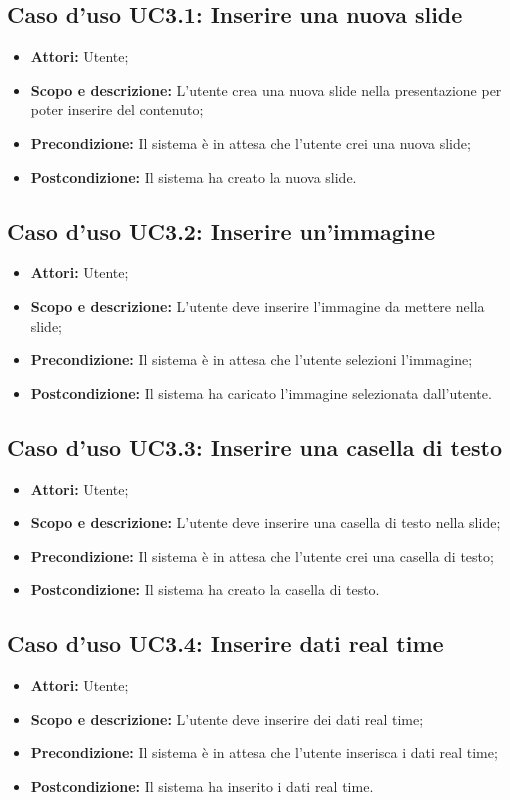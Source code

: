 \subsection{Caso d'uso UC3.1: Inserire una nuova slide}
\begin{itemize}
	\item \textbf{Attori:} Utente;
	\item \textbf{Scopo e descrizione:} L'utente crea una nuova slide nella presentazione per poter inserire del contenuto;
	\item \textbf{Precondizione:} Il sistema è in attesa che l'utente crei una nuova slide;
	\item \textbf{Postcondizione:} Il sistema ha creato la nuova slide.
\end{itemize}

\subsection{Caso d'uso UC3.2: Inserire un'immagine}
\begin{itemize}
\item \textbf{Attori:} Utente;
\item \textbf{Scopo e descrizione:} L'utente deve inserire l'immagine da mettere nella slide;
\item \textbf{Precondizione:} Il sistema è in attesa che l'utente selezioni l'immagine;
\item \textbf{Postcondizione:} Il sistema ha caricato l'immagine selezionata dall'utente.
\end{itemize}

\subsection{Caso d'uso UC3.3: Inserire una casella di testo}
\begin{itemize}
\item \textbf{Attori:} Utente;
\item \textbf{Scopo e descrizione:} L'utente deve inserire una casella di testo nella slide;
\item \textbf{Precondizione:} Il sistema è in attesa che l'utente crei una casella di testo;
\item \textbf{Postcondizione:} Il sistema ha creato la casella di testo.
\end{itemize}

\subsection{Caso d'uso UC3.4: Inserire dati real time}
\begin{itemize}
	\item \textbf{Attori:} Utente;
	\item \textbf{Scopo e descrizione:} L'utente deve inserire dei dati real time;
	\item \textbf{Precondizione:} Il sistema è in attesa che l'utente inserisca i dati real time;
	\item \textbf{Postcondizione:} Il sistema ha inserito i dati real time.
\end{itemize}

